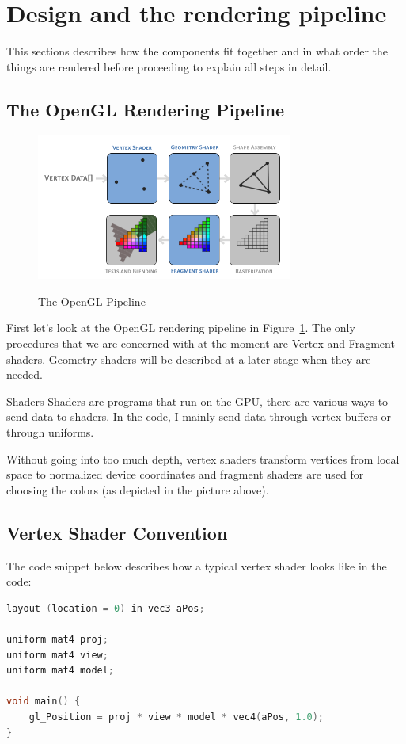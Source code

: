 \section{Design and the rendering pipeline}
This sections describes how the components fit together and in what order the things are rendered before proceeding to explain all steps in detail.

\subsection{The OpenGL Rendering Pipeline}
\begin{figure}[H]
    \centering
    \includegraphics[width=0.75\textwidth]{images/opengl_pipeline.png}
    \caption{The OpenGL Pipeline} \cite{learnopengl}
    \label{fig:opengl_pipeline}
\end{figure}

First let's look at the OpenGL rendering pipeline in Figure~\ref{fig:opengl_pipeline}. The only procedures that we are concerned with at the moment are Vertex and Fragment shaders. Geometry shaders will be described at a later stage when they are needed.

\begin{definition}{Shaders}
	Shaders are programs that run on the GPU, there are various ways to send data to shaders. In the code, I mainly send data through vertex buffers or through uniforms. 
\end{definition}

Without going into too much depth, vertex shaders transform vertices from local space to normalized device coordinates and fragment shaders are used for choosing the colors (as depicted in the picture above).

\subsection{Vertex Shader Convention}
The code snippet below describes how a typical vertex shader looks like in the code:
\begin{lstlisting}[language=C]
layout (location = 0) in vec3 aPos;

uniform mat4 proj;
uniform mat4 view;
uniform mat4 model;

void main() {
	gl_Position = proj * view * model * vec4(aPos, 1.0);
}

\end{lstlisting}

